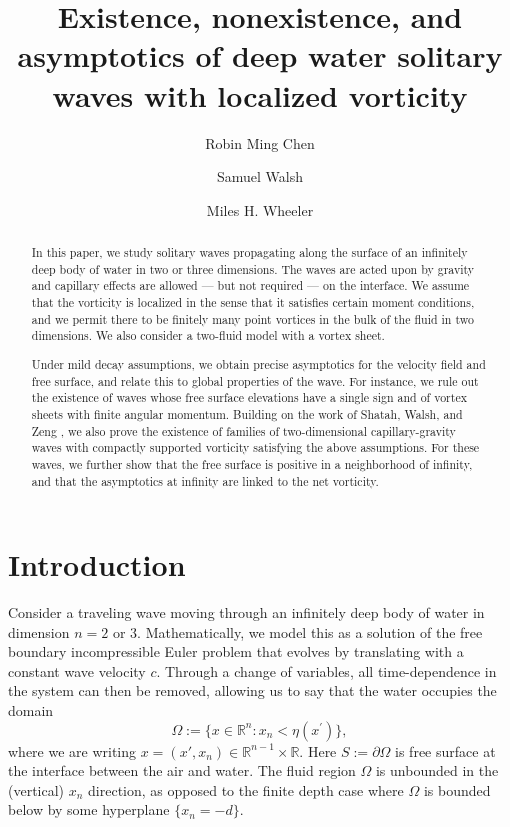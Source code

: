 \documentclass[11pt,reqno]{amsart}
\title[Localized vorticity asymptotics]{Existence, nonexistence, and asymptotics of deep water solitary waves with localized vorticity}
\author[R. M. Chen]{Robin Ming Chen}
\author[S. Walsh]{Samuel Walsh}
\author[M. H. Wheeler]{Miles H. Wheeler}
\newcommand{\R}{\mathbb{R}}
\theoremstyle{plain}
\theoremstyle{remark}
\numberwithin{equation}{section}
\begin{document}
\begin{abstract}
  In this paper, we study solitary waves propagating along the surface of an infinitely deep body of water in two or three dimensions.  The waves are acted upon by gravity and capillary effects are allowed --- but not required --- on the interface. We assume that the vorticity is localized in the sense that it satisfies certain moment conditions, and we permit there to be finitely many point vortices in the bulk of the fluid in two dimensions. We also consider a two-fluid model with a vortex sheet. 

  Under mild decay assumptions, we obtain precise asymptotics for the velocity field and free surface, and relate this to global properties of the wave. For instance, 
  we rule out the existence of waves whose free surface elevations have a single sign and of vortex sheets with finite angular momentum. Building
  on the work of Shatah, Walsh, and Zeng \cite{shatah2013travelling}, we also prove the existence of families of two-dimensional capillary-gravity waves with compactly supported vorticity satisfying the above assumptions. For these waves, we further show that the free surface is positive in a neighborhood of infinity, and that the asymptotics at infinity are linked to the net vorticity.
\end{abstract}

\maketitle

\setcounter{tocdepth}{1}
\tableofcontents

\section{Introduction}

Consider a traveling wave moving through an infinitely deep body of water in dimension $n=2$ or $3$. Mathematically, we model this as a solution of the free boundary incompressible  Euler problem that evolves by translating with a constant wave velocity $c$.  Through a change of variables, all time-dependence in the system can then be removed, allowing us to say that the water occupies the domain 
\begin{equation}\label{Omega def}
  \Omega := \{ x \in \R^n : x_n < \eta(x^\prime) \},
\end{equation}
where we are writing $x = (x',x_n) \in \R^{n-1} \times \R$. Here $S := \partial \Omega$ is free surface at the interface between the air and water. The fluid region $\Omega$ is unbounded in the (vertical) $x_n$ direction, as opposed to the finite depth case where $\Omega$ is bounded below by some hyperplane $\{x_n =-d\}$. 
\end{document}
